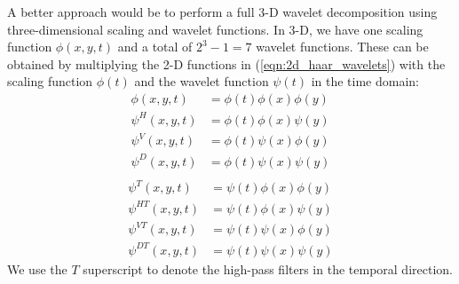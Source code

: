 A better approach would be to perform a full 3-D wavelet decomposition using three-dimensional scaling and wavelet functions.
In 3-D, we have one scaling function $\phi(x,y,t)$ and a total of $2^3-1=7$ wavelet functions.
These can be obtained by multiplying the 2-D functions in (\ref{eqn:2d_haar_wavelets}) with the scaling function $\phi(t)$ and the wavelet function $\psi(t)$ in the time domain:
\begin{equation*}
  \begin{split}
    \phi(x,y,t) &= \phi(t) \phi(x) \phi(y)\\
    \psi^H(x,y,t) &=\phi(t) \phi(x) \psi(y) \\
    \psi^V(x,y,t) &=\phi(t) \psi(x) \phi(y) \\
    \psi^D(x,y,t) &=\phi(t) \psi(x) \psi(y) \\
  \end{split}
\end{equation*}
\begin{equation*}
  \begin{split}
    \psi^T(x,y,t) &= \psi(t) \phi(x) \phi(y)\\
    \psi^{HT}(x,y,t) &=\psi(t) \phi(x) \psi(y) \\
    \psi^{VT}(x,y,t) &=\psi(t) \psi(x) \phi(y) \\
    \psi^{DT}(x,y,t) &=\psi(t) \psi(x) \psi(y)
  \end{split}
\end{equation*}
We use the $T$ superscript to denote the high-pass filters in the temporal direction.


